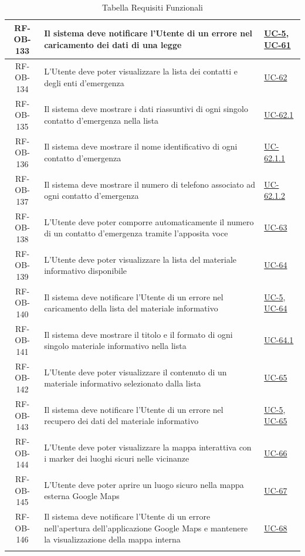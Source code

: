 \documentclass[a4paper,12pt]{article}
\begin{document}
\begin{center}
\begin{longtable}{|c|p{8.5cm}|>{\centering\arraybackslash}p{4cm}|}
RF-OB-133 & Il sistema deve notificare l'Utente di un errore nel caricamento dei dati di una legge & \hyperref[sec:UC-5]{UC-5}, \hyperref[sec:UC-61]{UC-61} \\
\hline
\rowcolor{gray!20}
RF-OB-134 & L'Utente deve poter visualizzare la lista dei contatti e degli enti d'emergenza & \hyperref[sec:UC-62]{UC-62} \\
\hline
\rowcolor{white}
RF-OB-135 & Il sistema deve mostrare i dati riassuntivi di ogni singolo contatto d'emergenza nella lista & \hyperref[subsec:UC-62.1]{UC-62.1} \\
\hline
\rowcolor{gray!20}
RF-OB-136 & Il sistema deve mostrare il nome identificativo di ogni contatto d'emergenza & \hyperref[subsec:UC-62.1.1]{UC-62.1.1} \\
\hline
\rowcolor{white}
RF-OB-137 & Il sistema deve mostrare il numero di telefono associato ad ogni contatto d'emergenza & \hyperref[subsec:UC-62.1.2]{UC-62.1.2} \\
\hline
\rowcolor{gray!20}
RF-OB-138 & L'Utente deve poter comporre automaticamente il numero di un contatto d'emergenza tramite l'apposita voce & \hyperref[sec:UC-63]{UC-63} \\
\hline
\rowcolor{white}
RF-OB-139 & L'Utente deve poter visualizzare la lista del materiale informativo disponibile & \hyperref[sec:UC-64]{UC-64} \\
\hline
\rowcolor{gray!20}
RF-OB-140 & Il sistema deve notificare l'Utente di un errore nel caricamento della lista del materiale informativo & \hyperref[sec:UC-5]{UC-5}, \hyperref[sec:UC-64]{UC-64} \\
\hline
\rowcolor{white}
RF-OB-141 & Il sistema deve mostrare il titolo e il formato di ogni singolo materiale informativo nella lista & \hyperref[subsec:UC-64.1]{UC-64.1} \\
\hline
\rowcolor{gray!20}
RF-OB-142 & L'Utente deve poter visualizzare il contenuto di un materiale informativo selezionato dalla lista & \hyperref[sec:UC-65]{UC-65} \\
\hline
\rowcolor{white}
RF-OB-143 & Il sistema deve notificare l'Utente di un errore nel recupero dei dati del materiale informativo & \hyperref[sec:UC-5]{UC-5}, \hyperref[sec:UC-65]{UC-65} \\
\hline
\rowcolor{gray!20}
RF-OB-144 & L'Utente deve poter visualizzare la mappa interattiva con i marker dei luoghi sicuri nelle vicinanze & \hyperref[sec:UC-66]{UC-66} \\
\hline
\rowcolor{white}
RF-OB-145 & L'Utente deve poter aprire un luogo sicuro nella mappa esterna Google Maps & \hyperref[subsec:UC-67]{UC-67} \\
\hline
\rowcolor{gray!20}
RF-OB-146 & Il sistema deve notificare l'Utente di un errore nell'apertura dell'applicazione Google Maps e mantenere la visualizzazione della mappa interna & \hyperref[subsec:UC-68]{UC-68} \\
\hline
\caption{Tabella Requisiti Funzionali} \label{tab:requisiti_funzionali} \\


\end{longtable}
\end{center}
\end{document}
